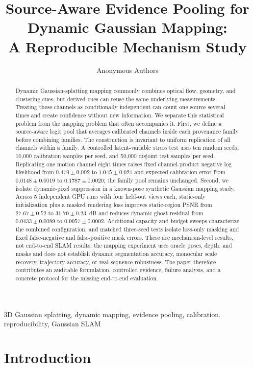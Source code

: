 \documentclass[10pt,conference]{IEEEtran}
\title{Source-Aware Evidence Pooling for Dynamic Gaussian Mapping:\\A Reproducible Mechanism Study}
\author{Anonymous Authors}
\begin{document}
\maketitle

\begin{abstract}
Dynamic Gaussian-splatting mapping commonly combines optical flow, geometry, and clustering cues, but derived cues can reuse the same underlying measurements. Treating these channels as conditionally independent can count one source several times and create confidence without new information. We separate this statistical problem from the mapping problem that often accompanies it. First, we define a source-aware logit pool that averages calibrated channels inside each provenance family before combining families. The construction is invariant to uniform replication of all channels within a family. A controlled latent-variable stress test uses ten random seeds, 10,000 calibration samples per seed, and 50,000 disjoint test samples per seed. Replicating one motion channel eight times raises fixed channel-product negative log likelihood from $0.479\pm0.002$ to $1.045\pm0.021$ and expected calibration error from $0.0148\pm0.0019$ to $0.1787\pm0.0020$; the family pool remains unchanged. Second, we isolate dynamic-pixel suppression in a known-pose synthetic Gaussian mapping study. Across 5 independent GPU runs with four held-out views each, static-only initialization plus a masked rendering loss improves static-region PSNR from $27.67\pm0.52$ to $31.70\pm0.23$~dB and reduces dynamic ghost residual from $0.0433\pm0.0089$ to $0.0057\pm0.0002$. Additional capacity and budget sweeps characterize the combined configuration, and matched three-seed tests isolate loss-only masking and fixed false-negative and false-positive mask errors. These are mechanism-level results, not end-to-end SLAM results: the mapping experiment uses oracle poses, depth, and masks and does not establish dynamic segmentation accuracy, monocular scale recovery, trajectory accuracy, or real-sequence robustness. The paper therefore contributes an auditable formulation, controlled evidence, failure analysis, and a concrete protocol for the missing end-to-end evaluation.
\end{abstract}

\begin{IEEEkeywords}
3D Gaussian splatting, dynamic mapping, evidence pooling, calibration, reproducibility, Gaussian SLAM
\end{IEEEkeywords}

\section{Introduction}
\end{document}
